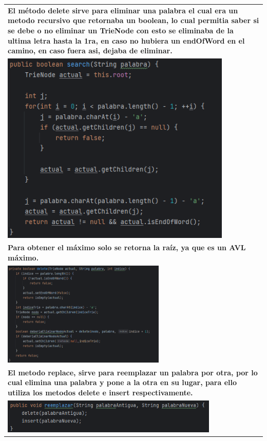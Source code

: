 \documentclass[9pt]{article}
\begin{document}
\begin{longtable}{|p{15cm}|}
		\textbf{ El método delete sirve para eliminar una palabra el cual era un metodo recursivo
		que retornaba un boolean, lo cual permitia saber si se debe o no eliminar un TrieNode
		con esto se eliminaba de la ultima letra hasta la 1ra, en caso no hubiera un endOfWord
		en el camino, en caso fuera asi, dejaba de eliminar.}\\
		\includegraphics[width=0.85\textwidth,keepaspectratio]{img/search.png}\\
		\textbf{Para obtener el máximo solo se retorna la raíz, ya que es un AVL máximo.		}\\
		\includegraphics[width=0.6\textwidth,keepaspectratio]{img/delete.png}\\
		\textbf{El metodo replace, sirve para reemplazar un palabra por otra,
		por lo cual elimina una palabra y pone a la otra en su lugar, para ello
		utiliza los metodos delete e insert respectivamente.}  \\
		\includegraphics[width=0.8\textwidth,keepaspectratio]{img/replace.png}\\

\end{longtable}
\end{document}
